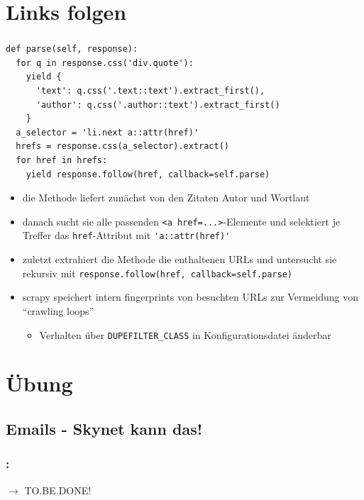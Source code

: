 \documentclass{beamer}
\begin{document}
\section{Links folgen}
\begin{frame}
	\frametitle{\insertsection{}}
	\begin{lstlisting}
def parse(self, response):
  for q in response.css('div.quote'):
    yield {
      'text': q.css('.text::text').extract_first(),
      'author': q.css('.author::text').extract_first()
    }
  a_selector = 'li.next a::attr(href)'
  hrefs = response.css(a_selector).extract()  
  for href in hrefs:    
    yield response.follow(href, callback=self.parse)
	\end{lstlisting}
	\begin{itemize}
		\item die Methode liefert zunächst von den Zitaten Autor und Wortlaut
		\item danach sucht sie alle passenden \lstinline|<a href=...>|-Elemente und selektiert je Treffer das \lstinline|href|-Attribut mit \lstinline|'a::attr(href)'| 
		
		\framebreak
		
		\item zuletzt extrahiert die Methode die enthaltenen URLs und untersucht sie rekursiv mit \lstinline|response.follow(href, callback=self.parse)| 
		\item scrapy speichert intern fingerprints von besuchten URLs zur Vermeidung von ``crawling loops'' \begin{itemize}
			\item Verhalten über \lstinline|DUPEFILTER_CLASS| in Konfigurationsdatei änderbar
		\end{itemize}
	\end{itemize}
\end{frame}


\section{Übung}

\subsection{Emails - Skynet kann das!}
\begin{frame}
	\frametitle{\insertsection{}: \insertsubsection{}}
	$\rightarrow$ TO.BE.DONE!
\end{frame}

\framebreak
\end{document}
